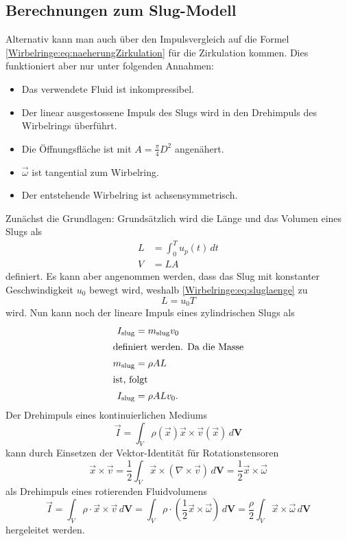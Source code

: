 \subsection{Berechnungen zum Slug-Modell}
Alternativ kann man auch über den Impulsvergleich auf die Formel \eqref{Wirbelringe:eq:naeherungZirkulation} für die Zirkulation kommen.
Dies funktioniert aber nur unter folgenden Annahmen:
\begin{itemize}
    \item Das verwendete Fluid ist inkompressibel.
    \item Der linear ausgestossene Impuls des Slugs wird in den Drehimpuls des Wirbelrings überführt.
    \item Die Öffnungsfläche ist mit \(A = \frac{\pi}{4} D^2\) angenähert.
    \item \(\vec{\omega}\) ist tangential zum Wirbelring.
    \item Der entstehende Wirbelring ist achsensymmetrisch.
\end{itemize} 

Zunächst die Grundlagen:
Grundsätzlich wird die Länge und das Volumen eines Slugs als
\begin{align}
    L
    &=
    \int_{0}^{T}u_p(t)\,dt\\
    \label{Wirbelringe:eq:sluglaenge}
    V
    &=
    LA
\end{align}
definiert.
Es kann aber angenommen werden, dass das Slug mit konstanter Geschwindigkeit \(u_0\) bewegt wird, weshalb \eqref{Wirbelringe:eq:sluglaenge} zu
\begin{equation}
    L
    =
    u_0T
\end{equation}
wird.
Nun kann noch der lineare Impuls eines zylindrischen Slugs als
\begin{align}
    I_{\text{slug}}
    &=
    m_{\text{slug}}v_0\\
    \intertext{definiert werden. Da die Masse}
    m_{\text{slug}}
    &=
    \rho AL\\
    \intertext{ist, folgt}
    I_{\text{slug}}
    &=
    \rho ALv_0
    \label{Wirbelringe:eq:slugImp}.
\end{align}
Der Drehimpuls eines kontinuierlichen Mediums
\begin{equation*}
    \vec{I}
    =
    \int_{V}\rho(\vec{x})\vec{x}\times\vec{v}(\vec{x})\,d\mathbf{V}
\end{equation*}
kann durch Einsetzen der Vektor-Identität für Rotationstensoren \cite{Wirbelringe:batchelor1967}
\begin{equation*}
    \vec{x}\times\vec{v}
    =
    \frac{1}{2}\int_{V}\vec{x}\times(\nabla\times\vec{v})\,d\mathbf{V}
    =
    \frac{1}{2}\vec{x}\times\vec{\omega}
\end{equation*}
als Drehimpuls eines rotierenden Fluidvolumens 
\begin{equation}
    \vec{I}
    =
    \int_{V}\rho\cdot\vec{x}\times\vec{v}\,d\mathbf{V}
    =
    \int_{V}\rho\cdot({\textstyle \frac{1}{2}}\vec{x}\times\vec{\omega})\,d\mathbf{V}
    =
    \frac{\rho}{2}\int_{V}\vec{x}\times\vec{\omega}\,d\mathbf{V}
    \label{Wirbelringe:eq:Drehimpuls}
\end{equation}
hergeleitet werden. 

